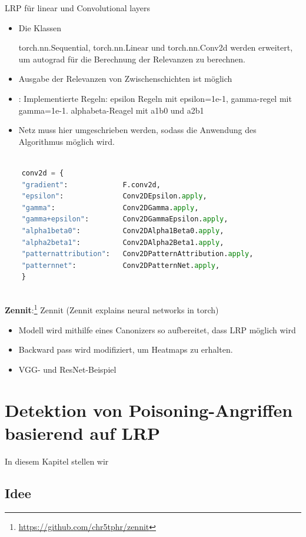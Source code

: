 \documentclass[11pt,a4paper]{article}
\numberwithin{equation}{section}
\begin{document}
	
	
	\noindent LRP für linear und Convolutional layers
	
	\begin{itemize}
		\item Die Klassen
		
		torch.nn.Sequential, torch.nn.Linear und torch.nn.Conv2d werden erweitert, um autograd für die Berechnung der Relevanzen zu berechnen.
		
		\item Ausgabe der Relevanzen von Zwischenschichten ist möglich
		\item: Implementierte Regeln: epsilon Regeln mit epsilon=1e-1, gamma-regel mit gamma=1e-1. alphabeta-Reagel mit a1b0 und a2b1
		\item Netz muss hier umgeschrieben werden, sodass die Anwendung des Algorithmus möglich wird.
	\end{itemize}
	
	\begin{lstlisting}[language=Python, caption=Implementierte Regeln fhvilshoj]
	
	conv2d = {
	"gradient":             F.conv2d,
	"epsilon":              Conv2DEpsilon.apply,
	"gamma":                Conv2DGamma.apply,
	"gamma+epsilon":        Conv2DGammaEpsilon.apply,
	"alpha1beta0":          Conv2DAlpha1Beta0.apply,
	"alpha2beta1":          Conv2DAlpha2Beta1.apply,
	"patternattribution":   Conv2DPatternAttribution.apply,
	"patternnet":           Conv2DPatternNet.apply,
	}
	
	\end{lstlisting}
	
	\noindent \textbf{Zennit}:\footnote{\url{https://github.com/chr5tphr/zennit}}
	Zennit (Zennit explains neural networks in torch) 
	\begin{itemize}
		\item Modell wird mithilfe eines Canonizers so aufbereitet, dass LRP möglich wird
		\item Backward pass wird modifiziert, um Heatmaps zu erhalten.
		\item VGG- und ResNet-Beispiel
	\end{itemize}
	\section{Detektion von Poisoning-Angriffen basierend auf LRP} 
	In diesem Kapitel stellen wir
	\subsection{Idee}
	
\end{document}

